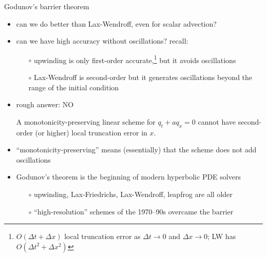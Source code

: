 \documentclass[10pt,hyperref,dvipsnames]{beamer}
\begin{document}
\begin{frame}{Godunov's barrier theorem}

\begin{itemize}
\item can we do better than Lax-Wendroff, even for scalar advection?
\item can we have high accuracy without oscillations? recall:
    \begin{itemize}
    \item[$\circ$] upwinding is only first-order accurate,\footnote{$O(\Delta t + \Delta x)$ local truncation error as $\Delta t\to 0$ and $\Delta x \to 0$; LW has $O(\Delta t^2 + \Delta x^2)$} but it avoids oscillations
    \item[$\circ$] Lax-Wendroff is second-order but it generates oscillations beyond the range of the initial condition
    \end{itemize}
\item rough answer: \alert{NO}

\medskip
\begin{theorem}  A monotonicity-preserving \alert<2>{linear} scheme for $q_t + a q_x=0$ cannot have second-order (or higher) local truncation error in $x$.\end{theorem}

\item ``monotonicity-preserving'' means (essentially) that the scheme does not add oscillations
\item Godunov's theorem is the beginning of modern hyperbolic PDE solvers
    \begin{itemize}
    \item[$\circ$] upwinding, Lax-Friedrichs, Lax-Wendroff, leapfrog are all older
    \item[$\circ$] ``high-resolution'' schemes of the 1970--90s overcame the barrier 
    \end{itemize}
\end{itemize}
\end{frame}
\end{document}
